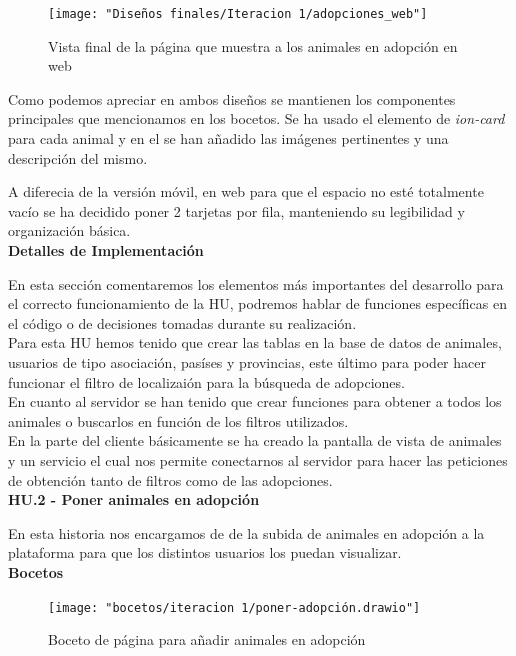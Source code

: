 \begin{figure}[H]
	\centering
	\texttt{[image: "Diseños finales/Iteracion 1/adopciones\_web"]}
	\caption{Vista final de la página que muestra a los animales en adopción en web}
	\label{fig:adopcionesDefWeb}
\end{figure}

Como podemos apreciar en ambos diseños se mantienen los componentes principales que mencionamos en los bocetos. Se ha usado el elemento de \textit{ion-card} para cada animal y en el se han añadido las imágenes pertinentes y una descripción del mismo.

A diferecia de la versión móvil, en web para que el espacio no esté totalmente vacío se ha decidido poner 2 tarjetas por fila, manteniendo su legibilidad y organización básica. \\


\textbf{Detalles de Implementación}

En esta sección comentaremos los elementos más importantes del desarrollo para el correcto funcionamiento de la HU, podremos hablar de funciones específicas en el código o de decisiones tomadas durante su realización. \\

Para esta HU hemos tenido que crear las tablas en la base de datos de animales, usuarios de tipo asociación, pasíses y provincias, este último para poder hacer funcionar el filtro de localizaión para la búsqueda de adopciones. \\

En cuanto al servidor se han tenido que crear funciones para obtener a todos los animales o buscarlos en función de los filtros utilizados. \\

En la parte del cliente básicamente se ha creado la pantalla de vista de animales y un servicio el cual nos permite conectarnos al servidor para hacer las peticiones de obtención tanto de filtros como de las adopciones. \\ 



\Large{\textbf{HU.2 - Poner animales en adopción}}


En esta historia nos encargamos de de la subida de animales en adopción a la plataforma para que los distintos usuarios los puedan visualizar. \\

\textbf{Bocetos}

\begin{figure}[H]
	\centering
	\texttt{[image: "bocetos/iteracion 1/poner-adopción.drawio"]}
	\caption{Boceto de página para añadir animales en adopción}
	\label{fig:poner-adopcion}
\end{figure}

